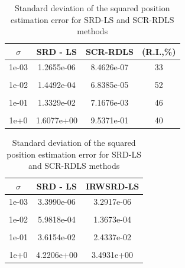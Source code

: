 \begin{table}[h]
\centering
\caption{MSE of position estimation for SRD-LS and SCR-RDLS methods}
\phantom{m}
\begin{tabular}{|c|c|c|c|} \hline
\centering
$\sigma$ & SRD - LS & SCR-RDLS & (R.I.,\%)  \\ \hline
1e-03&	1.2655e-06  & 8.4626e-07 &  33 \\ &&&\\
1e-02&	1.4492e-04 &  6.8385e-05 &  52 \\ &&&\\
1e-01&	1.3329e-02 & 7.1676e-03 &   46 \\ &&&\\
1e+0&	1.6077e+00 &  9.5371e-01 &   40  \\ %
\hline
\end{tabular}
\label{tab:scr_rdls}
\centering
\caption{Standard deviation of the squared position estimation error for SRD-LS and SCR-RDLS methods}
\phantom{m}
\begin{tabular}{|c|c|c|} \hline
$\sigma$ & SRD - LS & IRWSRD-LS  \\ \hline
1e-03&	3.3990e-06 &  3.2917e-06 \\ &&\\
1e-02&	5.9818e-04 &   1.3673e-04 \\ &&\\
1e-01&	3.6154e-02  & 2.4337e-02 \\ &&\\
1e+0&	4.2206e+00 &  3.4931e+00 \\ %
\hline
\end{tabular}
\label{tab:rdls}
\end{table}



